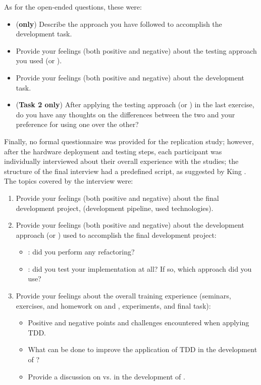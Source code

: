 \noindent As for the open-ended questions, these were:
\begin{itemize}
    \item (\textbf{\notdd only}) Describe the \notdd approach you have followed to accomplish the development task.
    \item Provide your feelings (both positive and negative) about the testing approach you used (\ie \tdd or \notdd).
    \item Provide your feelings (both positive and negative) about the development task.
    \item (\textbf{Task 2 only}) After applying the testing approach (\ie \tdd or \notdd) in the last exercise, do you have any thoughts on the differences between the two and your preference for using one over the other?
\end{itemize}

\noindent Finally, no formal questionnaire was provided for the replication study; however, after the hardware deployment and testing steps, each participant was individually interviewed about their overall experience with the studies; the structure of the final interview had a predefined script, as suggested by King \cite{King:2004}. The topics covered by the interview were:
\begin{enumerate}
    \item Provide your feelings (both positive and negative) about the final development project, (\eg development pipeline, used technologies).
    \item Provide your feelings (both positive and negative) about the development approach (\ie \tdd or \notdd) used to accomplish the final development project:
        \begin{itemize}
            \item \tdd: did you perform any refactoring? 
            \item \notdd: did you test your implementation at all? If so, which approach did you use?
        \end{itemize}
    \item Provide your feelings about the overall training experience (seminars, exercises, and homework on \tdd and \notdd, experiments, and final task):
        \begin{itemize}
            \item Positive and negative points and challenges encountered when applying TDD.
            \item What can be done to improve the application of TDD in the development of \ess?
            \item Provide a discussion on \tdd vs. \notdd in the development of \ess.
        \end{itemize}
\end{enumerate}

